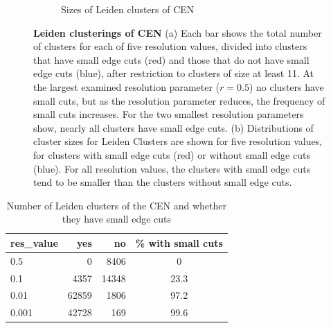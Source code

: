 \documentclass[11pt]{article}   	%
\begin{document}
\begin{figure}[H]
\begin{subfigure}[t]{0.45\textwidth}
\begin{center}
\caption{Sizes of Leiden clusters of CEN}
\end{center}
\label{fig:cenistouched-part2}
\end{subfigure}
\caption{\textbf {Leiden clusterings of CEN} (a)
Each bar shows the total number of clusters for each of five resolution values, divided into clusters that have small edge cuts (red)  and those that do not have small edge cuts (blue), after restriction  to clusters of size at least 11. At the largest examined resolution parameter ($r=0.5$) no clusters have small cuts, but  as the resolution parameter reduces, the frequency of  small cuts increases.
For the two smallest resolution parameters show, nearly all clusters have small edge cuts.
(b)  Distributions of cluster sizes  for Leiden Clusters are shown for five resolution values, for clusters with small edge cuts (red) or without small edge cuts (blue). For all resolution values, the clusters with small edge cuts tend to be smaller than the clusters without small edge cuts.}
\end{figure}



\begin{table}[ht]
\centering
\begin{tabular}{lrrc}
  \hline
res\_value  & yes & no & \% with small cuts\\
  \hline
  0.5 & 0  & 8406  & 0\\
  0.1 & 4357 & 14348 & 23.3\\
    0.01 & 62859 & 1806 & 97.2\\
  0.001 & 42728 & 169 & 99.6 \\
   \hline
\end{tabular}
\caption{Number of Leiden clusters of the CEN and whether they have small edge cuts}
\end{table}
\end{document}
